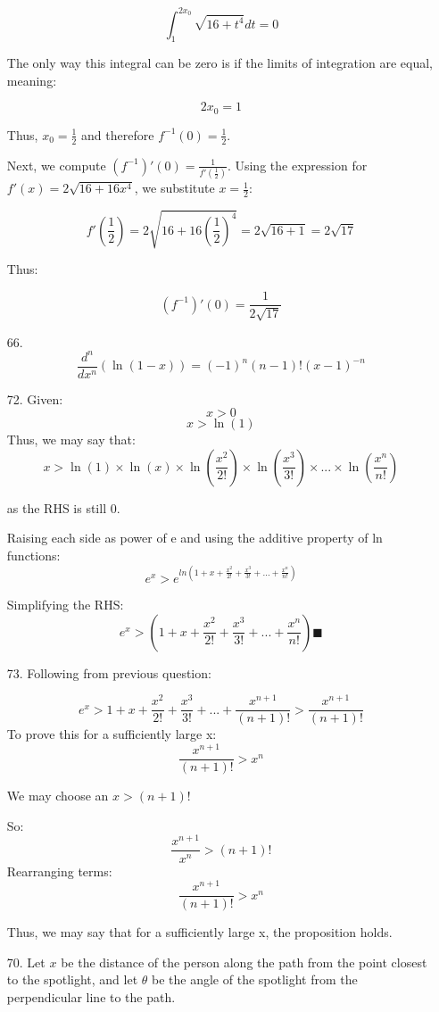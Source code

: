 \documentclass[12pt]{article}
\begin{document}
\begin{enumerate}[start=1,label={\bfseries. },leftmargin=1in]
\[
\int_1^{2x_0} \sqrt{16 + t^4} dt = 0
\]

The only way this integral can be zero is if the limits of integration are equal, meaning:

\[
2x_0 = 1
\]

Thus, $x_0 = \frac{1}{2}$ and therefore $f^{-1}(0) = \frac{1}{2}$.

Next, we compute $(f^{-1})'(0) = \frac{1}{f'(\frac{1}{2})}$. Using the expression for $f'(x) = 2\sqrt{16 + 16x^4}$, we substitute $x = \frac{1}{2}$:

\[
f'\left( \frac{1}{2} \right) = 2\sqrt{16 + 16\left(\frac{1}{2}\right)^4} = 2\sqrt{16 + 1} = 2\sqrt{17}
\]

Thus:

\[
(f^{-1})'(0) = \frac{1}{2\sqrt{17}}
\]

\item [66. ]
\[
\frac{d^n}{dx^n}\left(\ln(1-x)\right) = (-1)^n(n-1)!(x-1)^{-n}
\]

 \item [72. ]
 Given:
 \[
 x>0
 \]
 \[
 x > \ln(1)
 \]
 Thus, we may say that:
 \[
 x  > \ln(1)\times \ln(x) \times\ln\left(\frac{x^2}{2!}\right)\times\ln\left(\frac{x^3}{3!}\right)
 \times ... \times  \ln\left(\frac{x^n}{n!}\right)\] 

as the RHS is still 0.

Raising each side as power of e and using the additive property of ln functions:
\[
e^x > e^{ln\left( 1 + x + \frac{x^2}{2!} + \frac{x^3}{3!} + ... +\frac{x^n}{n!}\right)}
\]

Simplifying the RHS:
\[
e^x > \left( 1 + x + \frac{x^2}{2!} + \frac{x^3}{3!} + ... +\frac{x^n}{n!}\right)
\blacksquare
\]

\item [73. ]Following from previous question:

\[
e^x >  1 + x + \frac{x^2}{2!} + \frac{x^3}{3!} + ... +\frac{x^{n+1}}{(n+1)!} > \frac{x^{n+1}}{(n+1)!}
\]
To prove this for a sufficiently large x:
\[
\frac{x^{n+1}}{(n+1)!} > x^n
\]

We may choose an $x > (n+1)!$

So:
\[
\frac{x^{n+1}}{x^n} > (n+1)!
\]
Rearranging terms:
\[
\frac{x^{n+1}}{(n+1)!} > x^n
\]


Thus, we may say that for a sufficiently large x, the proposition holds.
\item [70.] Let \( x \) be the distance of the person along the path from the point closest to the spotlight, and let \( \theta \) be the angle of the spotlight from the perpendicular line to the path.


\end{enumerate}
\end{document}
